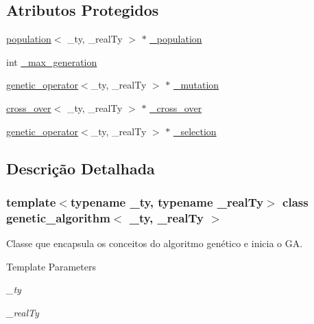 \subsection*{Atributos Protegidos}
\begin{DoxyCompactItemize}
\item 
\hyperlink{classpopulation}{population}$<$ \_\-ty, \_\-realTy $>$ $\ast$ \hyperlink{classgenetic__algorithm_a1b2109867086541f375f091a34b1413b}{\_\-population}
\item 
int \hyperlink{classgenetic__algorithm_aa27789d88ad571a15a9ad984f238f51e}{\_\-max\_\-generation}
\item 
\hyperlink{classgenetic__operator}{genetic\_\-operator}$<$\_\-ty, \_\-realTy $>$ $\ast$ \hyperlink{classgenetic__algorithm_a9f03558907645bff987053e1571c9816}{\_\-mutation}
\item 
\hyperlink{classcross__over}{cross\_\-over}$<$ \_\-ty, \_\-realTy $>$ $\ast$ \hyperlink{classgenetic__algorithm_a4b1145baa8b987a6e69681f79a939b24}{\_\-cross\_\-over}
\item 
\hyperlink{classgenetic__operator}{genetic\_\-operator}$<$\_\-ty, \_\-realTy $>$ $\ast$ \hyperlink{classgenetic__algorithm_a237298e9294747b7531beca4df11e049}{\_\-selection}
\end{DoxyCompactItemize}


\subsection{Descrição Detalhada}
\subsubsection*{template$<$typename \_\-ty, typename \_\-realTy$>$ class genetic\_\-algorithm$<$ \_\-ty, \_\-realTy $>$}

Classe que encapsula os conceitos do algoritmo genético e inicia o GA.


\begin{DoxyTemplParams}{Template Parameters}
\item[{\em \_\-ty}]\item[{\em \_\-realTy}]\end{DoxyTemplParams}


